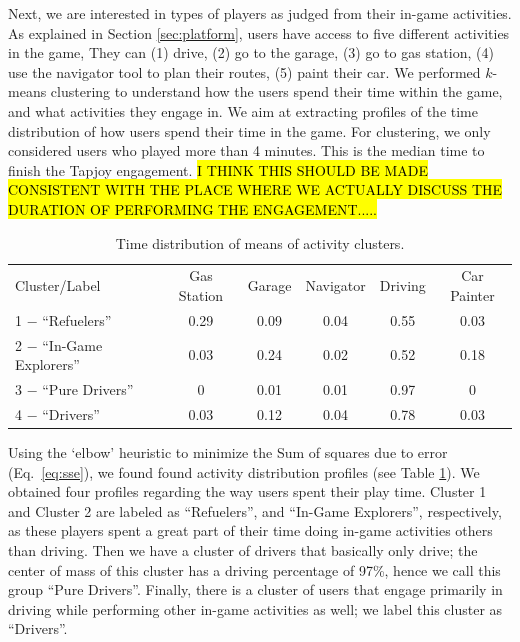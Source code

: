\documentclass[preprint,authoryear,12pt]{elsarticle}
\begin{document}

Next, we are interested in types of players as judged from their in-game activities.
As explained in Section \ref{sec:platform}, users have access to five different activities in the game, They can (1) drive, (2) go to the garage, (3) go to gas station, (4) use the navigator tool to plan their routes, (5) paint their car.
We performed $k$-means clustering to understand how the users spend their time within the game, and what activities they engage in. We aim at extracting profiles of the time distribution of how users spend their time in the game.
For clustering, we only considered users who played more than 4 minutes. This is the median time to finish the Tapjoy engagement. \hl{I THINK THIS SHOULD BE MADE CONSISTENT WITH THE PLACE WHERE WE ACTUALLY DISCUSS THE DURATION OF PERFORMING THE ENGAGEMENT.....}

\begin{table}[tb]
	\renewcommand*{\arraystretch}{1.2}
	\caption{Time distribution of means of activity clusters.}
	\begin{center}
		\begin{tabular}{l|c|c|c|c|c}
			Cluster/Label & Gas Station &	Garage & Navigator & Driving & Car Painter\\
			1 $-$ ``Refuelers'' &	0.29 &	0.09 &	0.04 &	0.55 &	0.03\\
			2 $-$ ``In-Game Explorers'' &	0.03 &	0.24 &	0.02 &	0.52 &	0.18 \\
			3 $-$ ``Pure Drivers'' &	0 &	0.01 &	0.01 &	0.97 &	0  \\
			4 $-$ ``Drivers'' &	0.03 &	0.12 &	0.04 &	0.78 &	0.03   \\
		\end{tabular}
	\end{center}
	\label{T:cluster_activities}
\end{table}

Using the `elbow' heuristic to minimize the Sum of squares due to error (Eq.~\ref{eq:sse}), we found found activity distribution profiles (see Table \ref{T:cluster_activities}).
We obtained four profiles regarding the way users spent their play time. Cluster 1 and Cluster 2 are labeled as ``Refuelers'', and ``In-Game Explorers'', respectively, as these players spent a great part of their time doing in-game activities others than driving. Then we have a cluster of drivers that basically only drive; the center of mass of this cluster has a driving percentage of 97\%, hence we call this group ``Pure Drivers''. Finally, there is a cluster of users that engage primarily in driving while performing other in-game activities as well; we label this cluster as ``Drivers''.
\end{document}
